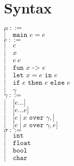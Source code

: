 ﻿\documentclass[5pt]{article}
\begin{document}
\section{Syntax}
\begin{multicols}{2}
\noindent $\mu \ ::= $ \\
\hspace*{10mm} $| \quad \texttt{main } e = e$ \\

\noindent $e \ ::= $ \\
\hspace*{10mm} $| \quad c$ \\
\hspace*{10mm} $| \quad x$ \\
\hspace*{10mm} $| \quad e \ e$ \\
\hspace*{10mm} $| \quad \texttt{fun } x \texttt{ -> } e$ \\
\hspace*{10mm} $| \quad \texttt{let }x = e \texttt{ in } e$ \\
\hspace*{10mm} $| \quad \texttt{if } e \texttt{ then } e \texttt{ else } e$ \\
\hspace*{10mm} $| \quad \gamma$ \\

\noindent $\gamma \ ::= $ \\
\hspace*{10mm} $| \quad \texttt{[}e...\texttt{]}$ \\
\hspace*{10mm} $| \quad \texttt{[}e...e\texttt{]}$ \\
\hspace*{10mm} $| \quad \texttt{[}e \ | \ x \texttt{ over } \gamma, \texttt{]}$ \\
\hspace*{10mm} $| \quad \texttt{[}e \ | \ x \texttt{ over } \gamma, e \texttt{]}$ \\

\noindent $\sigma \ ::= $ \\
\hspace*{10mm} $| \quad \texttt{int}$ \\
\hspace*{10mm} $| \quad \texttt{float}$ \\
\hspace*{10mm} $| \quad \texttt{bool}$ \\
\hspace*{10mm} $| \quad \texttt{char}$ \\


\end{multicols}
\end{document}
